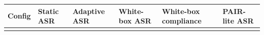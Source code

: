 \documentclass[

]{article}
\newcounter{none} %
\begin{document}
{\def\LTcaptype{none} %

\begin{longtable}[]{@{}

  >{\raggedright\arraybackslash}p{}

  >{\raggedright\arraybackslash}p{}

  >{\raggedright\arraybackslash}p{}

  >{\raggedright\arraybackslash}p{}

  >{\raggedright\arraybackslash}p{}

  >{\raggedright\arraybackslash}p{}@{}}

\toprule\noalign{}

\begin{minipage}[b]{\linewidth}\raggedright

Config

\end{minipage} & \begin{minipage}[b]{\linewidth}\raggedright

Static ASR

\end{minipage} & \begin{minipage}[b]{\linewidth}\raggedright

Adaptive ASR

\end{minipage} & \begin{minipage}[b]{\linewidth}\raggedright

White-box ASR

\end{minipage} & \begin{minipage}[b]{\linewidth}\raggedright

White-box compliance

\end{minipage} & \begin{minipage}[b]{\linewidth}\raggedright

PAIR-lite ASR

\end{minipage} \\

\midrule\noalign{}

\endhead

\bottomrule\noalign{}


\end{longtable}}
\end{document}
